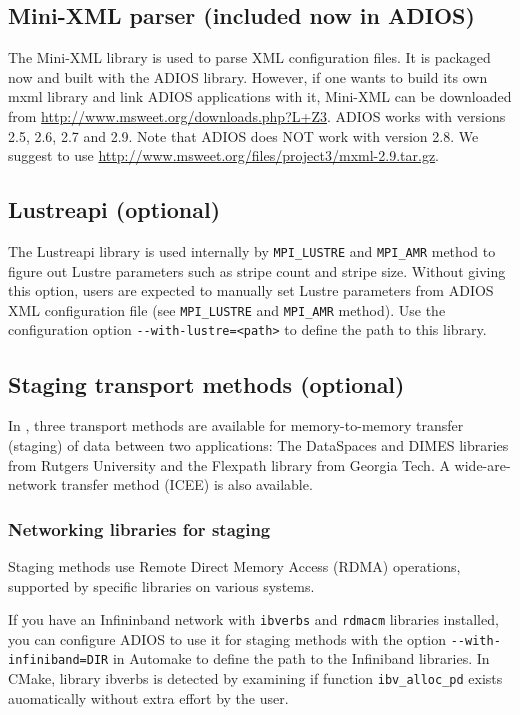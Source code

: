 \subsection{Mini-XML parser (included now in ADIOS)}

The Mini-XML library is used to parse XML configuration files. It is packaged now and built with the ADIOS library. 
However, if one wants to build its own mxml library and link ADIOS applications with it, Mini-XML can be
downloaded from \url{http://www.msweet.org/downloads.php?L+Z3}. ADIOS works with
versions 2.5, 2.6, 2.7 and 2.9. Note that ADIOS does NOT work with version 2.8.
We suggest to use 
\url{http://www.msweet.org/files/project3/mxml-2.9.tar.gz}.


\subsection{Lustreapi (optional)}

The Lustreapi library is used internally by \verb+MPI_LUSTRE+ and \verb+MPI_AMR+ method to
figure out Lustre parameters such as stripe count and stripe size.  Without giving
this option, users are expected to manually set Lustre parameters from ADIOS XML
configuration file (see \verb+MPI_LUSTRE+ and \verb+MPI_AMR+ method).
Use the configuration option
\verb+--with-lustre=<path>+ to define the path to this library.

\subsection{Staging transport methods (optional)}

In \adiosversion, three transport methods
are available for memory-to-memory transfer (staging) of data between two
applications: The DataSpaces and DIMES libraries from Rutgers University and
the Flexpath library from Georgia Tech. A wide-are-network transfer method (ICEE) is also available.

\subsubsection{Networking libraries for staging}

Staging methods use Remote Direct Memory Access (RDMA) operations, supported by specific libraries
on various systems.

\vspace*{6pt}
If you have an Infininband network with \verb+ibverbs+ and \verb+rdmacm+ libraries installed, you can configure ADIOS to use it for staging methods with the option
\verb+--with-infiniband=DIR+  in Automake to define the path to the Infiniband libraries. In CMake, library ibverbs is detected by examining if function \verb+ibv_alloc_pd+ exists auomatically without extra effort by the user.

